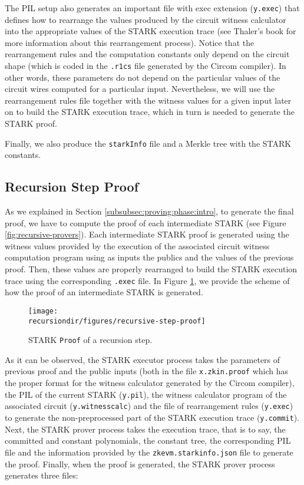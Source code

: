 The PIL setup also generates an important file with exec extension (\texttt{y.exec})
that defines how to rearrange the values produced by the circuit witness calculator into the appropriate values of the STARK execution trace (see Thaler's book for more information about this rearrangement process). 
Notice that the rearrangement rules and the computation constants only depend on 
the circuit shape (which is coded in the \texttt{.r1cs} file generated by the Circom compiler). In other words, these parameters do not depend on the particular values of the circuit wires computed for a particular input.
Nevertheless, we will use the rearrangement rules file together with the witness values for a given input later on to build the STARK execution trace, which in turn is needed to generate the STARK proof.

Finally, we also produce the \texttt{starkInfo} file and a Merkle tree with the STARK constants.

\subsection{Recursion Step Proof \label{subsec:recursion:step:proof}}

As we explained in Section \ref{subsubsec:proving:phase:intro}, to generate the final proof, we have to compute the proof of each 
intermediate STARK (see Figure \ref{fig:recursive-provers}).
Each intermediate STARK proof is generated using the witness values provided by the execution of the associated circuit witness computation program using as inputs the publics and the values of the previous proof.
Then, these values are properly rearranged to build the STARK execution trace using the corresponding \texttt{.exec} file.
In Figure \ref{fig:recursion:step:proof}, we provide the scheme of how the proof of an intermediate STARK is generated. 

\begin{figure}[H]
\centering
\texttt{[image: \\recursiondir/figures/recursive-step-proof]}
\caption{STARK \texttt{Proof} of a recursion step.}
\label{fig:recursion:step:proof}
\end{figure}

As it can be observed, the STARK executor process takes the parameters of previous proof and the public inputs (both in the file \texttt{x.zkin.proof} which
has the proper format for the witness calculator generated by the Circom compiler), the PIL of the current STARK (\texttt{y.pil}), the witness calculator program of the associated circuit (\texttt{y.witnesscalc}) and the file of rearrangement rules (\texttt{y.exec}) to generate the non-preprocessed part of the STARK execution trace (\texttt{y.commit}). 
Next, the STARK prover process takes the execution trace, that is to say, the committed and constant polynomials, the constant tree, the corresponding PIL file and the information provided by the \texttt{zkevm.starkinfo.json} file to generate the proof.
Finally, when the proof is generated, the STARK prover process generates three files:

